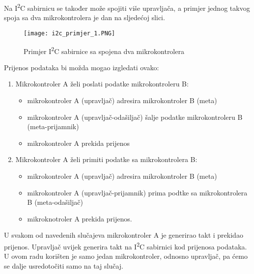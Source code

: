 Na I\textsuperscript{2}C sabirnicu se također može spojiti više upravljača, a primjer jednog takvog spoja sa dva mikrokontrolera je dan na sljedećoj slici.
\begin{figure}[hp]
	\centering
	\texttt{[image: i2c\_primjer\_1.PNG]}
	\caption{Primjer I\textsuperscript{2}C sabirnice sa spojena dva
	mikrokontrolera \cite{i2c_manual}}
	\label{fig:i2c_primjer_1}
\end{figure}
Prijenos podataka bi možda mogao izgledati ovako:
\begin{enumerate}
	\item Mikrokontroler A želi poslati podatke mikrokontroleru B:
	\begin{itemize}
		\item mikrokontroler A (upravljač) adresira mikrokontroler B (meta)
		\item mikrokontroler A (upravljač-odašiljač) šalje podatke
		mikrokontroleru B (meta-prijamnik)
		\item mikrokontroler A prekida prijenos
	\end{itemize}
	\item Mikrokontroler A želi primiti podatke sa mikrokontrolera B:
		\begin{itemize}
		\item mikrokontroler A (upravljač) adresira mikrokontroler B (meta)
		\item mikrokontroler A (upravljač-prijamnik) prima podtke sa
		mikrokontrolera B (meta-odašiljač)
		\item mikroknotroler A prekida prijenos.
	\end{itemize}
\end{enumerate}
U svakom od navedenih slučajeva mikrokontroler A je generirao takt i prekidao prijenos. Upravljač uvijek generira takt na I\textsuperscript{2}C sabirnici kod prijenosa podataka. U ovom radu korišten je samo jedan mikrokontroler, odnosno upravljač, pa ćemo se dalje usredotočiti samo na taj slučaj.

